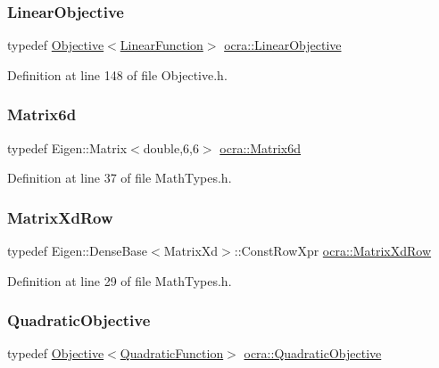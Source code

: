 \subsubsection{\texorpdfstring{Linear\+Objective}{LinearObjective}}
{\footnotesize\ttfamily typedef \hyperlink{classocra_1_1Objective}{Objective}$<$\hyperlink{classocra_1_1LinearFunction}{Linear\+Function}$>$ \hyperlink{namespaceocra_a1dc9b2b863ed7542eb48b66c2fe5793a}{ocra\+::\+Linear\+Objective}}



Definition at line 148 of file Objective.\+h.

\hypertarget{namespaceocra_a4ee053c9fed8722df857e4f8f4d6d334}{}\label{namespaceocra_a4ee053c9fed8722df857e4f8f4d6d334} 
\subsubsection{\texorpdfstring{Matrix6d}{Matrix6d}}
{\footnotesize\ttfamily typedef Eigen\+::\+Matrix$<$double,6,6$>$ \hyperlink{namespaceocra_a4ee053c9fed8722df857e4f8f4d6d334}{ocra\+::\+Matrix6d}}



Definition at line 37 of file Math\+Types.\+h.

\hypertarget{namespaceocra_a608bf0522317ed1df3bbfc6a5753bc01}{}\label{namespaceocra_a608bf0522317ed1df3bbfc6a5753bc01} 
\subsubsection{\texorpdfstring{Matrix\+Xd\+Row}{MatrixXdRow}}
{\footnotesize\ttfamily typedef Eigen\+::\+Dense\+Base$<$Matrix\+Xd$>$\+::Const\+Row\+Xpr \hyperlink{namespaceocra_a608bf0522317ed1df3bbfc6a5753bc01}{ocra\+::\+Matrix\+Xd\+Row}}



Definition at line 29 of file Math\+Types.\+h.

\hypertarget{namespaceocra_a0b50673710f087c0f1733aefd1a8e0f7}{}\label{namespaceocra_a0b50673710f087c0f1733aefd1a8e0f7} 
\subsubsection{\texorpdfstring{Quadratic\+Objective}{QuadraticObjective}}
{\footnotesize\ttfamily typedef \hyperlink{classocra_1_1Objective}{Objective}$<$\hyperlink{classocra_1_1QuadraticFunction}{Quadratic\+Function}$>$ \hyperlink{namespaceocra_a0b50673710f087c0f1733aefd1a8e0f7}{ocra\+::\+Quadratic\+Objective}}



